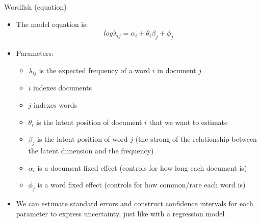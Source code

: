 \documentclass[pdf, 9pt, fleqn, handout]{beamer}
\begin{document}
\begin{frame}{Wordfish (equation)}
\begin{itemize}
\item The model equation is:
\begin{align*}
log \lambda_{ij} = \alpha_i + \theta_i \beta_j + \phi_j
\end{align*}
\item Parameters: \\[0.5em]
\begin{itemize}
\item $\lambda_{ij}$ is the expected frequency of a word $i$ in document $j$ \\[0.5em]
\item $i$ indexes documents \\[0.5em]
\item $j$ indexes words \\[0.5em]
\item $\theta_i$ is the latent position of document $i$ that we want to estimate \\[0.5em]
\item $\beta_j$ is the latent position of word $j$ (the strong of the relationship between the latent dimension and the frequency) \\[0.5em]
\item $\alpha_i$ is a document fixed effect (controls for how long each document is) \\[0.5em]
\item $\phi_j$ is a word fixed effect (controls for how common/rare each word is) \\[1em]
\end{itemize}
\item We can estimate standard errors and construct confidence intervals for each parameter to express uncertainty, just like with a regression model
\end{itemize}
\end{frame}
\end{document}
